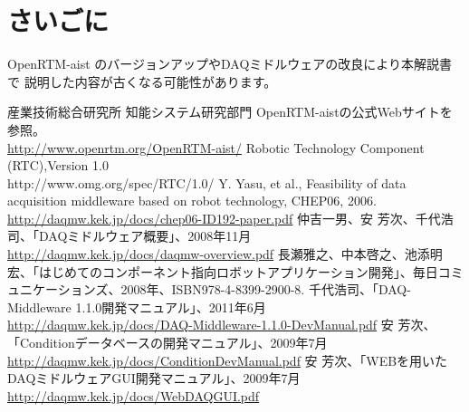 \documentclass[a4j,10pt,dvips,onecolumn,oneside,final]{jarticle}%
\begin{document}
\section{さいごに}
OpenRTM-aist のバージョンアップやDAQミドルウェアの改良により本解説書で
説明した内容が古くなる可能性があります。

\begin{thebibliography}{99}

   産業技術総合研究所 知能システム研究部門 OpenRTM-aistの公式Webサイトを参照。\\
   \url{http://www.openrtm.org/OpenRTM-aist/}
  Robotic Technology Component (RTC),Version 1.0\\
   http://www.omg.org/spec/RTC/1.0/
  Y. Yasu, et al., Feasibility of data acquisition middleware based on robot technology, CHEP06, 2006.\\
   \url{http://daqmw.kek.jp/docs/chep06-ID192-paper.pdf}
  仲吉一男、安 芳次、千代浩司、「DAQミドルウェア概要」、2008年11月\\
   \url{http://daqmw.kek.jp/docs/daqmw-overview.pdf}
  長瀬雅之、中本啓之、池添明宏、「はじめてのコンポーネント指向ロボットアプリケーション開発」、毎日コミュニケーションズ、2008年、ISBN978-4-8399-2900-8.
 千代浩司、「DAQ-Middleware 1.1.0開発マニュアル」、2011年6月\\
\url{http://daqmw.kek.jp/docs/DAQ-Middleware-1.1.0-DevManual.pdf}
 安 芳次、「Conditionデータベースの開発マニュアル」、2009年7月\\
\url{http://daqmw.kek.jp/docs/ConditionDevManual.pdf}
 安 芳次、「WEBを用いたDAQミドルウェアGUI開発マニュアル」、2009年7月\\
\url{http://daqmw.kek.jp/docs/WebDAQGUI.pdf}
\end{thebibliography}

\newpage
\appendix
\end{document}

